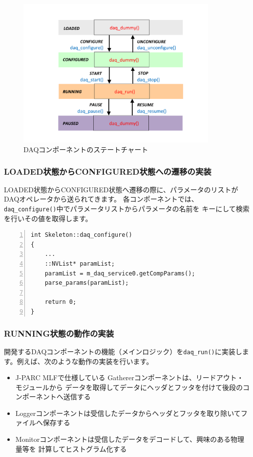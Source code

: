 \documentclass[a4j,10pt,dvips,onecolumn,oneside,final]{jarticle}%
\begin{document}
\begin{figure}[htbp]
 \begin{center}
  \includegraphics[width=100mm]{state-func.pdf}
  \caption{DAQコンポーネントのステートチャート}
  \label{state-func.fig}
 \end{center}
\end{figure}

\subsubsection{LOADED状態からCONFIGURED状態への遷移の実装}\label{parse-param}
LOADED状態からCONFIGURED状態へ遷移の際に、パラメータのリストがDAQオペレータから送られてきます。
各コンポーネントでは、\verb|daq_configure()|中でパラメータリストからパラメータの名前を
キーにして検索を行いその値を取得します。
\begin{Verbatim}[tabsize=4,
    baselinestretch=0.8,
    numbers=left,
    frame=single,
    fontsize=\small,
    framesep=5pt,
    numbersep=5pt]
int Skeleton::daq_configure()
{
    ...
    ::NVList* paramList;
    paramList = m_daq_service0.getCompParams();
    parse_params(paramList);

    return 0;
}
\end{Verbatim}

\subsubsection{RUNNING状態の動作の実装}
開発するDAQコンポーネントの機能（メインロジック）を\verb|daq_run()|に実装します。例えば、次のような動作の実装を行います。
\begin{itemize}
\item J-PARC MLFで仕様している Gathererコンポーネントは、リードアウト・モジュールから
  データを取得してデータにヘッダとフッタを付けて後段のコンポーネントへ送信する
\item Loggerコンポーネントは受信したデータからヘッダとフッタを取り除いてファイルへ保存する
\item Monitorコンポーネントは受信したデータをデコードして、興味のある物理量等を
  計算してヒストグラム化する
\end{itemize}
\end{document}
